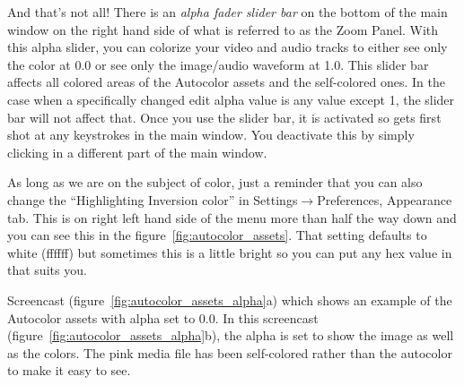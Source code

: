 And that’s not all!  
There is an \emph{alpha fader slider bar} on the bottom of the main window on the right hand side of what is referred to as the Zoom Panel.  
With this alpha slider, you can colorize your video and audio tracks to either see only the color at 0.0 or see only the image/audio waveform at 1.0.  
This slider bar affects all colored areas of the Autocolor assets and the self-colored ones.  
In the case when a specifically changed edit alpha value is any value except 1, the slider bar will not affect that.  
Once you use the slider bar, it is activated so gets first shot at any keystrokes in the main window.  
You deactivate this by simply clicking in a different part of the main window.  

As long as we are on the subject of color, just a reminder that you can also change the “Highlighting Inversion color” in Settings$\rightarrow$Preferences, Appearance tab.  
This is on right left hand side of the menu more than half the way down and you can see this in the figure~\ref{fig:autocolor_assets}.  
That setting defaults to white (ffffff) but sometimes this is a little bright so you can put any hex value in that suits you.

Screencast (figure~\ref{fig:autocolor_assets_alpha}a) which shows an example of the Autocolor assets with alpha set to 0.0.
In this screencast (figure~\ref{fig:autocolor_assets_alpha}b), the alpha is set to show the image as well as the colors.  The pink media file has been self-colored rather than the autocolor to make it easy to see.

